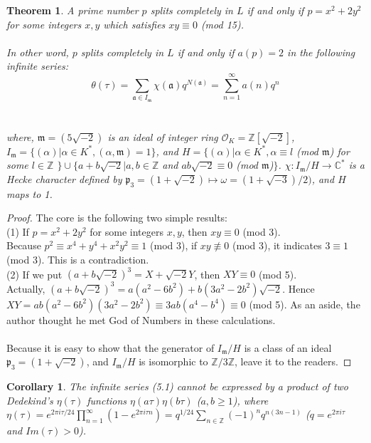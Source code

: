 \documentclass{article}
\newtheorem{thm}{Theorem}[section]
\newtheorem{coro}{Corollary}[section]
\begin{document}
\begin{thm} 
\upshape
A prime number $p$ splits completely in $L$ if and only if $p=x^{2} + 2y^{2}$ for some integers $x, y$ which satisfies $xy\equiv 0$ (mod 15). 
\\
\\
In other word, $p$ splits completely in $L$ if and only if $a(p) = 2$ in the following infinite series:
\begin{equation}
\theta(\tau) = \sum_{\mathfrak{a}\in I_{\mathfrak{m}}}\chi(\mathfrak{a})q^{N(\mathfrak{a})} = \sum^{\infty}_{n=1}a(n)q^{n}
\end{equation}
\\
\\
where, $\mathfrak{m} = (5\sqrt{-2})$ is an ideal of integer ring $\mathcal{O}_{K} =\mathbb{Z}[\sqrt{-2}]$, $I_{\mathfrak{m}} = \{(\alpha)|\alpha \in K^{*}, (\alpha, \mathfrak{m}) = 1\}$, and $H = \{(\alpha)|\alpha \in K^{*}, \alpha \equiv l$ (mod $\mathfrak{m}$) for some $l\in \mathbb{Z}$ $\}\cup \{a + b\sqrt{-2}|a, b \in \mathbb{Z}$ and $ab\sqrt{-2}\equiv 0$ (mod $\mathfrak{m}$)$\}$. $\chi : I_{\mathfrak{m}}/H \rightarrow \mathbb{C}^{*}$ is a Hecke character defined by $\mathfrak{p}_{3} = (1+\sqrt{-2})\mapsto \omega = (1+\sqrt{-3})/2)$, and $H$ maps to 1.
\end{thm}

\begin{proof}
The core is the following two simple results:
\\
(1) If $p = x^2 + 2y^2$ for some integers $x,y$, then $xy\equiv 0$ (mod 3).
\\
Because $p^{2} \equiv x^{4} +y^{4} + x^{2}y^{2} \equiv 1$ (mod 3), if $xy\not\equiv 0$ (mod 3), it indicates $3\equiv1$ (mod 3). This is a contradiction. 
\\
(2) If we put $(a+b\sqrt{-2})^{3} = X+\sqrt{-2}Y$, then $XY\equiv 0$ (mod 5).
\\
Actually, $(a+b\sqrt{-2})^{3} = a(a^{2}-6b^{2}) + b(3a^{2}-2b^{2})\sqrt{-2}$. Hence $XY = ab(a^{2}-6b^{2})(3a^{2}-2b^{2}) \equiv 3ab(a^{4}-b^{4})\equiv 0$ (mod 5). As an aside, the author thought he met God of Numbers in these calculations.
\\
\\
Because it is easy to show that the generator of $I_{\mathfrak{m}}/H$ is a class of an ideal $\mathfrak{p}_{3}=(1+\sqrt{-2})$, and $I_{\mathfrak{m}}/H$ is isomorphic to $\mathbb{Z}/3\mathbb{Z}$, leave it to the readers.
\end{proof}

\begin{coro}
\upshape
The infinite series (5.1) cannot be expressed by a product of two Dedekind's $\eta(\tau)$ functions $\eta(a\tau)\eta(b\tau)$ ($a,b\geq 1$), where $\eta(\tau) = e^{2\pi i\tau/24}\prod_{n=1}^{\infty}(1-e^{2\pi i\tau n}) = q^{1/24}\sum_{n\in \mathbb{Z}}(-1)^{n}q^{n(3n-1)}$ ($q=e^{2\pi i\tau}$ and $Im(\tau)>0$).
\end{coro}
\end{document}
